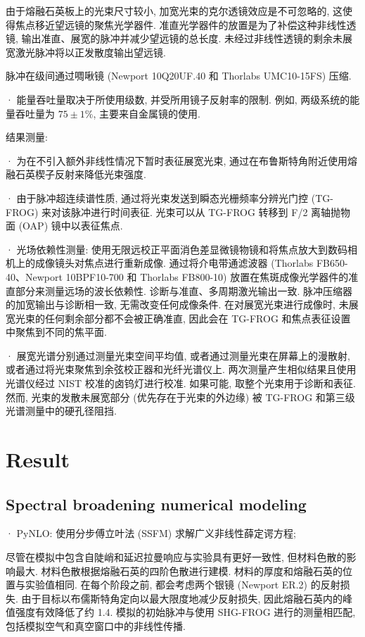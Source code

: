 \documentclass[14pt,a4paper,oneside]{article}
\begin{document}
由于熔融石英板上的光束尺寸较小, 加宽光束的克尔透镜效应是不可忽略的, 这使得焦点移近望远镜的聚焦光学器件\cite{khazanovNonlinearCompressionHighpower2019}. 准直光学器件的放置是为了补偿这种非线性透镜, 输出准直、展宽的脉冲并减少望远镜的总长度. 未经过非线性透镜的剩余未展宽激光脉冲将以正发散度输出望远镜. 

脉冲在级间通过啁啾镜 (Newport 10Q20UF.40 和 Thorlabs UMC10-15FS) 压缩. 

· 能量吞吐量取决于所使用级数, 并受所用镜子反射率的限制. 例如, 两级系统的能量吞吐量为 $75 \pm 1\%$, 主要来自金属镜的使用. 

结果测量:

· 为在不引入额外非线性情况下暂时表征展宽光束, 通过在布鲁斯特角附近使用熔融石英楔子反射来降低光束强度. 

· 由于脉冲超连续谱性质, 通过将光束发送到瞬态光栅频率分辨光门控 (TG-FROG) 来对该脉冲进行时间表征. 光束可以从 TG-FROG 转移到 F/2 离轴抛物面 (OAP) 镜中以表征焦点. 

· 光场依赖性测量: 使用无限远校正平面消色差显微镜物镜和将焦点放大到数码相机上的成像镜头对焦点进行重新成像. 通过将介电带通滤波器 (Thorlabs FB650-40、Newport 10BPF10-700 和 Thorlabs FB800-10) 放置在焦斑成像光学器件的准直部分来测量远场的波长依赖性. 诊断与准直、多周期激光输出一致. 脉冲压缩器的加宽输出与诊断相一致, 无需改变任何成像条件. 在对展宽光束进行成像时, 未展宽光束的任何剩余部分都不会被正确准直, 因此会在 TG-FROG 和焦点表征设置中聚焦到不同的焦平面. 

· 展宽光谱分别通过测量光束空间平均值, 或者通过测量光束在屏幕上的漫散射, 或者通过将光束聚焦到余弦校正器和光纤光谱仪上. 两次测量产生相似结果且使用光谱仪经过 NIST 校准的卤钨灯进行校准. 如果可能, 取整个光束用于诊断和表征. 然而, 光束的发散未展宽部分 (优先存在于光束的外边缘) 被 TG-FROG 和第三级光谱测量中的硬孔径阻挡. 

\section{Result}

\subsection{Spectral broadening numerical modeling}

· PyNLO: 使用分步傅立叶法 (SSFM) 求解广义非线性薛定谔方程;\cite{hultFourthorderRungeKutta2007}

尽管在模拟中包含自陡峭和延迟拉曼响应与实验具有更好一致性, 但材料色散的影响最大. 材料色散根据熔融石英的四阶色散进行建模. 材料的厚度和熔融石英的位置与实验值相同. 在每个阶段之前, 都会考虑两个银镜 (Newport ER.2) 的反射损失. 由于目标以布儒斯特角定向以最大限度地减少反射损失, 因此熔融石英内的峰值强度有效降低了约 1.4. 模拟的初始脉冲与使用 SHG-FROG 进行的测量相匹配, 包括模拟空气和真空窗口中的非线性传播. 
\end{document}
